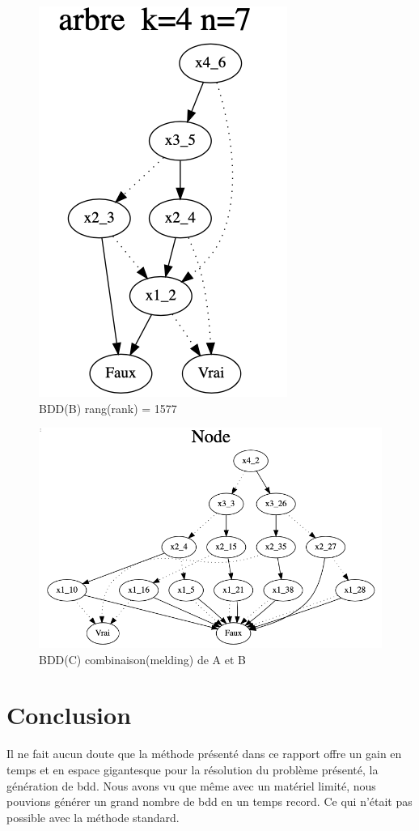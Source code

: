 \documentclass[french]{article}
\begin{document}
\begin{figure}[h!]
    \centering
    \includegraphics[scale=0.4]{arb_1577.png}
    \caption{BDD(B) rang(rank) = 1577}
    \label{fig:graphe_B}
\end{figure}

\begin{figure}[h!]
    \centering
    \includegraphics[scale=0.4]{abr_melding_C.png}
    \caption{BDD(C) combinaison(melding) de A et B}
    \label{fig:graphe_C}
\end{figure}


\section{Conclusion}
Il ne fait aucun doute que la méthode présenté dans ce rapport offre un gain en temps et en espace gigantesque pour la résolution du problème présenté, la génération de bdd. Nous avons vu que même avec un matériel limité, nous pouvions générer un grand nombre de bdd en un temps record. Ce qui n'était pas possible avec la méthode standard. 
\end{document}
